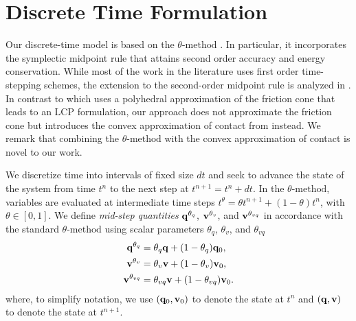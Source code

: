 
\section{Discrete Time Formulation}
\label{sec:discrete_time_formulation}

Our discrete-time model is based on the $\theta\text{-method}$ \cite[\S
II.7]{bib:hairer2008solving}. In particular, it incorporates the symplectic
midpoint rule that attains second order accuracy and energy conservation. While
most of the work in the literature uses first order time-stepping schemes, the
extension to the second-order midpoint rule is analyzed in
\cite{bib:potra2006linearly}. In contrast to \cite{bib:potra2006linearly} which
uses a polyhedral approximation of the friction cone that leads to an LCP
formulation, our approach does not approximate the friction cone but introduces
the convex approximation of contact from \cite{bib:anitescu2006} instead. We
remark that combining the $\theta\text{-method}$ with the convex approximation
of contact is novel to our work. 

We discretize time into intervals of fixed size $dt$ and seek to advance the
state of the system from time $t^n$ to the next step at $t^{n+1} = t^n + dt$. In
the $\theta\text{-method}$, variables are evaluated at intermediate time steps
$t^\theta = \theta t^{n+1}+(1-\theta)t^{n}$, with $\theta \in [0, 1]$. We define
\emph{mid-step quantities} ${\mathbf{q}}^{\theta_{q}}$, ${\mathbf{v}}^{\theta_{v}}$, and
${\mathbf{v}}^{\theta_{vq}}$ in accordance with the standard $\theta\text{-method}$
using scalar parameters $\theta_q$, $\theta_v$, and $\theta_{vq}$
\begin{align}
	\mf{q}^{\theta_q} &= \theta_q\mf{q} + (1-\theta_{q})\mf{q}_0,\nonumber\\
	\mf{v}^{\theta_v} &= \theta_v\mf{v} + (1-\theta_v)\mf{v}_0,\nonumber\\
	\mf{v}^{\theta_{vq}} &= \theta_{vq}\mf{v} + (1-\theta_{vq})\mf{v}_0.
	\label{eq:theta_method}
\end{align}
where, to simplify notation, we use $({\mathbf{q}}_0, {\mathbf{v}}_0)$ to denote the state
at $t^n$ and $({\mathbf{q}}, {\mathbf{v}})$ to denote the state at $t^{n+1}$.

